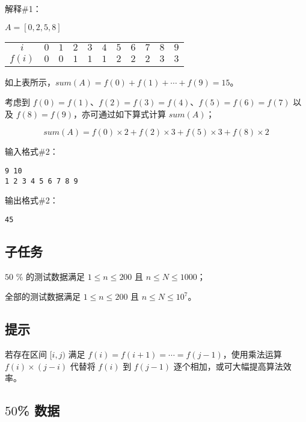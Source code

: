 \documentclass[cn,10pt,math=newtx,citestyle=gb7714-2015,bibstyle=gb7714-2015]{elegantbook}
\begin{document}
解释\#1：

$A=[0, 2, 5, 8]$

\begin{table}[htbp]
  \centering
  \begin{tabular}{ccccccccccc}
    \toprule
    $i$ & $0$ & $1$ & $2$ & $3$ & $4$ & $5$ & $6$ & $7$ & $8$ & $9$ \\
    $f(i)$ & $0$ & $0$ & $1$ & $1$ & $1$ & $2$ & $2$ & $2$ & $3$ & $3$ \\
    \bottomrule
  \end{tabular}
\end{table}

如上表所示，$sum(A)=f(0)+f(1)+\cdots + f(9)=15$。

考虑到 $f(0)=f(1)$、$f(2)=f(3)=f(4)$、$f(5)=f(6)=f(7)$ 以及 $f(8)=f(9)$，亦可通过如下算式计算 $sum(A)$；

\begin{equation*}
  sum(A)=f(0)\times 2+f(2)\times 3+f(5)\times 3 + f(8)\times 2
\end{equation*}

输入格式\#2：

\begin{lstlisting}
9 10
1 2 3 4 5 6 7 8 9
\end{lstlisting}

输出格式\#2：

\begin{lstlisting}
45
\end{lstlisting}

\subsection*{子任务}

$50$ \% 的测试数据满足 $1\le n\le 200$ 且 $n\le N\le 1000$；

全部的测试数据满足 $1\le n\le 200$ 且 $n\le N\le 10^7$。

\subsection*{提示}

若存在区间 $[i,j)$ 满足 $f(i)=f(i+1)=\cdots=f(j-1)$，使用乘法运算 $f(i)\times (j-i)$ 代替将 $f(i)$ 到 $f(j-1)$ 逐个相加，或可大幅提高算法效率。

\subsection{$50$\% 数据}
\end{document}
